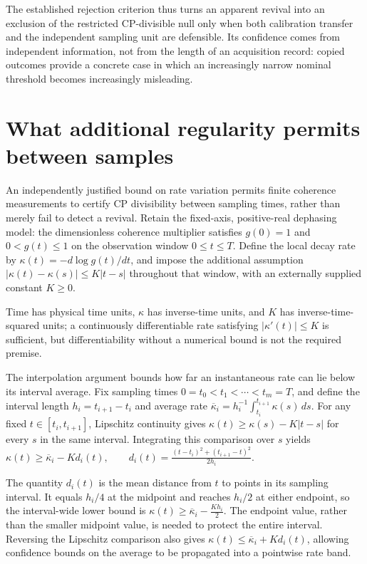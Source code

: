 \documentclass[11pt]{article}
\begin{document}
The established rejection criterion thus turns an apparent revival into an exclusion of the restricted CP-divisible null only when both calibration transfer and the independent sampling unit are defensible. Its confidence comes from independent information, not from the length of an acquisition record: copied outcomes provide a concrete case in which an increasingly narrow nominal threshold becomes increasingly misleading.

\section{What additional regularity permits between samples}
An independently justified bound on rate variation permits finite coherence measurements to certify CP divisibility between sampling times, rather than merely fail to detect a revival. Retain the fixed-axis, positive-real dephasing model: the dimensionless coherence multiplier satisfies $g(0)=1$ and $0<g(t)\leq1$ on the observation window $0\leq t\leq T$. Define the local decay rate by $\kappa(t)=-d\log g(t)/dt$, and impose the additional assumption $|\kappa(t)-\kappa(s)|\leq K|t-s|$ throughout that window, with an externally supplied constant $K\geq0$.

Time has physical time units, $\kappa$ has inverse-time units, and $K$ has inverse-time-squared units; a continuously differentiable rate satisfying $|\kappa'(t)|\leq K$ is sufficient, but differentiability without a numerical bound is not the required premise.

The interpolation argument bounds how far an instantaneous rate can lie below its interval average. Fix sampling times $0=t_0<t_1<\cdots<t_m=T$, and define the interval length $h_i=t_{i+1}-t_i$ and average rate $\overline\kappa_i=h_i^{-1}\int_{t_i}^{t_{i+1}}\kappa(s)\,ds$. For any fixed $t\in[t_i,t_{i+1}]$, Lipschitz continuity gives $\kappa(t)\geq\kappa(s)-K|t-s|$ for every $s$ in the same interval. Integrating this comparison over $s$ yields
$\kappa(t)\geq\overline\kappa_i-Kd_i(t),\qquad d_i(t)=\frac{(t-t_i)^2+(t_{i+1}-t)^2}{2h_i}.$

The quantity $d_i(t)$ is the mean distance from $t$ to points in its sampling interval. It equals $h_i/4$ at the midpoint and reaches $h_i/2$ at either endpoint, so the interval-wide lower bound is
$\kappa(t)\geq\overline\kappa_i-\frac{Kh_i}{2}.$
The endpoint value, rather than the smaller midpoint value, is needed to protect the entire interval. Reversing the Lipschitz comparison also gives $\kappa(t)\leq\overline\kappa_i+Kd_i(t)$, allowing confidence bounds on the average to be propagated into a pointwise rate band.
\end{document}
